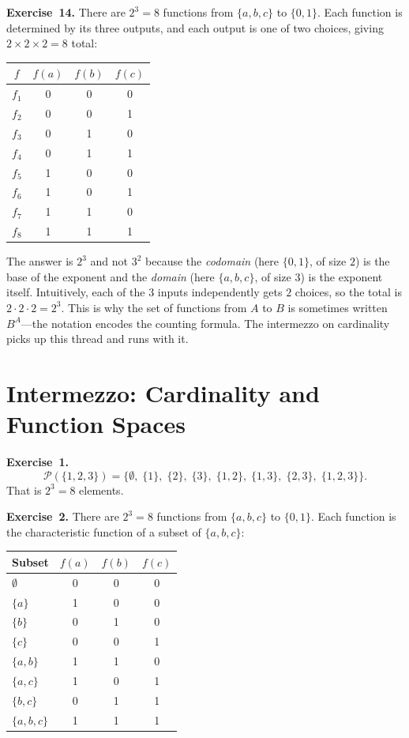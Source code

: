 \documentclass[11pt]{article}
\begin{document}
\medskip
\textbf{Exercise~14.}
There are $2^3 = 8$ functions from $\{a, b, c\}$ to $\{0, 1\}$. Each function is determined by its three outputs, and each output is one of two choices, giving $2 \times 2 \times 2 = 8$ total:
\begin{center}
\begin{tabular}{c|ccc}
\toprule
$f$ & $f(a)$ & $f(b)$ & $f(c)$ \\
\midrule
$f_1$ & 0 & 0 & 0 \\
$f_2$ & 0 & 0 & 1 \\
$f_3$ & 0 & 1 & 0 \\
$f_4$ & 0 & 1 & 1 \\
$f_5$ & 1 & 0 & 0 \\
$f_6$ & 1 & 0 & 1 \\
$f_7$ & 1 & 1 & 0 \\
$f_8$ & 1 & 1 & 1 \\
\bottomrule
\end{tabular}
\end{center}
The answer is $2^3$ and not $3^2$ because the \emph{codomain} (here $\{0,1\}$, of size $2$) is the base of the exponent and the \emph{domain} (here $\{a,b,c\}$, of size $3$) is the exponent itself. Intuitively, each of the $3$ inputs independently gets $2$ choices, so the total is $2 \cdot 2 \cdot 2 = 2^3$. This is why the set of functions from $A$ to $B$ is sometimes written $B^A$---the notation encodes the counting formula. The intermezzo on cardinality picks up this thread and runs with it.

\section*{Intermezzo: Cardinality and Function Spaces}

\textbf{Exercise~1.}
\[
  \mathcal{P}(\{1,2,3\}) = \bigl\{\emptyset,\;\{1\},\;\{2\},\;\{3\},\;\{1,2\},\;\{1,3\},\;\{2,3\},\;\{1,2,3\}\bigr\}.
\]
That is $2^3 = 8$ elements.

\medskip
\textbf{Exercise~2.}
There are $2^3 = 8$ functions from $\{a,b,c\}$ to $\{0,1\}$.  Each function
is the characteristic function of a subset of $\{a,b,c\}$:

\begin{center}
\begin{tabular}{l|ccc}
\toprule
Subset & $f(a)$ & $f(b)$ & $f(c)$ \\
\midrule
$\emptyset$     & 0 & 0 & 0 \\
$\{a\}$         & 1 & 0 & 0 \\
$\{b\}$         & 0 & 1 & 0 \\
$\{c\}$         & 0 & 0 & 1 \\
$\{a,b\}$       & 1 & 1 & 0 \\
$\{a,c\}$       & 1 & 0 & 1 \\
$\{b,c\}$       & 0 & 1 & 1 \\
$\{a,b,c\}$     & 1 & 1 & 1 \\
\bottomrule
\end{tabular}
\end{center}
\end{document}
